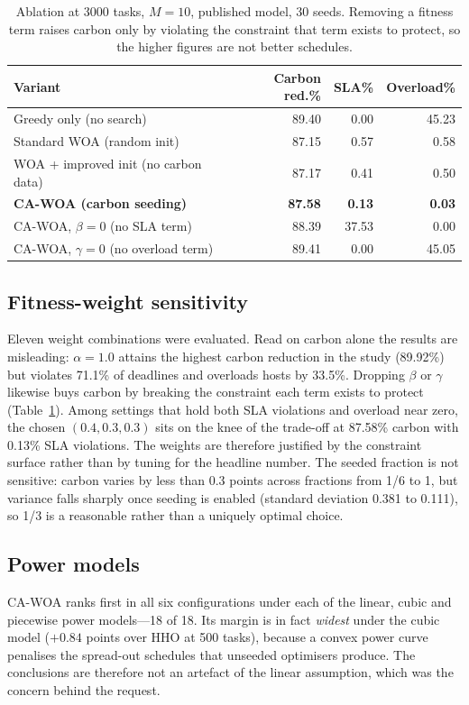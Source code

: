 \documentclass[12pt,a4paper]{article}
\begin{document}
\begin{table}[H]\centering\footnotesize
\caption{Ablation at 3000 tasks, $M=10$, published model, 30 seeds. Removing a fitness term raises carbon
only by violating the constraint that term exists to protect, so the higher figures are not better
schedules.}\label{tab:ablation}
\begin{tabular}{lrrr}
\toprule
Variant & Carbon red.\% & SLA\% & Overload\% \\ \midrule
Greedy only (no search)              & 89.40 & 0.00  & 45.23 \\
Standard WOA (random init)           & 87.15 & 0.57  & 0.58 \\
WOA + improved init (no carbon data) & 87.17 & 0.41  & 0.50 \\
\textbf{CA-WOA (carbon seeding)}     & \textbf{87.58} & \textbf{0.13} & \textbf{0.03} \\
CA-WOA, $\beta=0$ (no SLA term)      & 88.39 & 37.53 & 0.00 \\
CA-WOA, $\gamma=0$ (no overload term)& 89.41 & 0.00  & 45.05 \\
\bottomrule
\end{tabular}
\end{table}

\subsection{Fitness-weight sensitivity}\label{sec:weights}
Eleven weight combinations were evaluated. Read on carbon alone the results are misleading: $\alpha=1.0$
attains the highest carbon reduction in the study (89.92\%) but violates 71.1\% of deadlines and overloads
hosts by 33.5\%. Dropping $\beta$ or $\gamma$ likewise buys carbon by breaking the constraint each term
exists to protect (Table~\ref{tab:ablation}). Among settings that hold both SLA violations and overload near
zero, the chosen $(0.4,0.3,0.3)$ sits on the knee of the trade-off at 87.58\% carbon with 0.13\% SLA
violations. The weights are therefore justified by the constraint surface rather than by tuning for the
headline number. The seeded fraction is not sensitive: carbon varies by less than 0.3 points across fractions
from 1/6 to 1, but variance falls sharply once seeding is enabled (standard deviation 0.381 to 0.111), so
1/3 is a reasonable rather than a uniquely optimal choice.

\subsection{Power models}\label{sec:power}
CA-WOA ranks first in all six configurations under each of the linear, cubic and piecewise power models---18 of
18. Its margin is in fact \emph{widest} under the cubic model ($+0.84$ points over HHO at 500 tasks), because
a convex power curve penalises the spread-out schedules that unseeded optimisers produce. The conclusions are
therefore not an artefact of the linear assumption, which was the concern behind the request.
\end{document}
